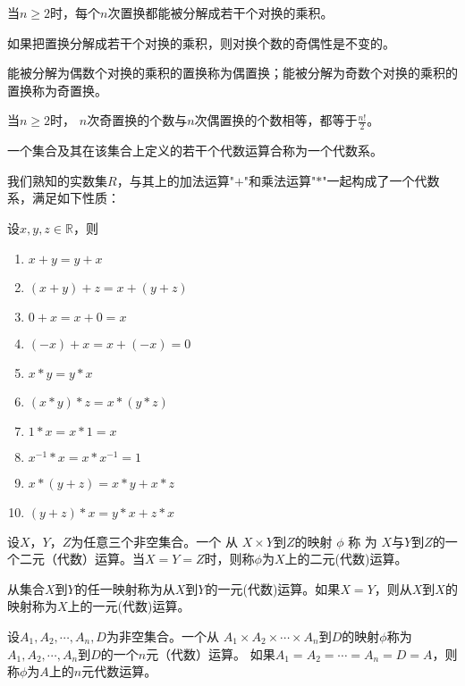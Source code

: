    \begin{Thm}
    当$n\geq 2$时，每个$n$次置换都能被分解成若干个对换的乘积。
   \end{Thm}
   \begin{Thm}
    如果把置换分解成若干个对换的乘积，则对换个数的奇偶性是不变的。
  \end{Thm}
  \begin{Def}
    能被分解为偶数个对换的乘积的置换称为偶置换；能被分解为奇数个对换的乘积的置换称为奇置换。
  \end{Def}
    \begin{Thm}
    当$n \geq 2$时， $n$次奇置换的个数与$n$次偶置换的个数相等，都等于$\frac{n!}{2}$。
  \end{Thm}
      \begin{Def}
    一个集合及其在该集合上定义的若干个代数运算合称为一个代数系。
  \end{Def}
我们熟知的实数集$R$，与其上的加法运算"$+$"和乘法运算"$*$"一起构成了一个代数系，满足如下性质：
  \begin{Thm}
    设$x, y, z \in \mathbb{R}$，则
   \begin{enumerate}
   \item   $x + y = y + x$
   \item   $(x + y) + z = x + (y + z)$
   \item   $0 + x = x + 0 = x$
   \item   $(-x) + x =x + (-x) = 0$
   \item   $x * y = y * x$
   \item   $(x * y) * z = x * (y *z)$
   \item   $1 * x = x * 1 = x$
   \item   $x^{-1} * x = x * x^{-1} = 1$
   \item   $x* (y + z) = x * y + x * z$
   \item   $(y + z) * x = y * x + z * x$
    \end{enumerate}
  \end{Thm}
  \begin{Def}
    设$X$，$Y$，$Z$为任意三个非空集合。一个 从 $X\times Y$到$Z$的映射 $\phi$ 称 为 $X$与$Y$到$Z$的一个二元（代数）运算。当$X=Y=Z$时，则称$\phi$为$X$上的二元(代数)运算。
  \end{Def}
  \begin{Def}
    从集合$X$到$Y$的任一映射称为从$X$到$Y$的一元(代数)运算。如果$X=Y$，则从$X$到$X$的映射称为$X$上的一元(代数)运算。
  \end{Def}
  \begin{Def}
    设$A_1, A_2, \cdots, A_n, D$为非空集合。一个从 $A_1\times A_2\times \cdots \times A_n$到$D$的映射$\phi$称为$A_1, A_2, \cdots, A_n$到$D$的一个$n$元（代数）运算。
    如果$A_1=A_2=\cdots=A_n=D=A$，则称$\phi$为$A$上的$n$元代数运算。
  \end{Def}

